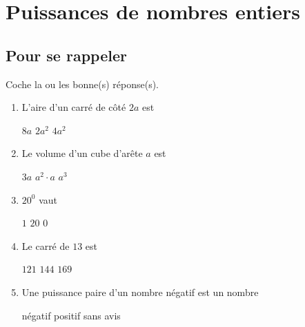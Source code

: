 \documentclass[../../syllabus_2.tex]{subfiles}
\begin{document}
\chapter{Puissances de nombres entiers}
\section{Pour se rappeler}
\begin{exercise}
	Coche la ou les bonne(s) réponse(s).\par
	\begin{enumerate}[itemsep=1em]
		\item L'aire d'un carré de côté \(2a\) est
		      \begin{qcm}
			      \choice \(8a\)
			      \choice \(2a^2\)
			      \choice \(4a^2\)
		      \end{qcm}

		\item Le volume d'un cube d'arête \(a\) est
		      \begin{qcm}
			      \choice \(3a\)
			      \choice \(a^2 \cdot a\)
			      \choice \(a^3\)
		      \end{qcm}

		\item \(20^0\) vaut
		      \begin{qcm}
			      \choice \(1\)
			      \choice \(20\)
			      \choice \(0\)
		      \end{qcm}

		\item Le carré de \(13\) est
		      \begin{qcm}
			      \choice \(121\)
			      \choice \(144\)
			      \choice \(169\)
		      \end{qcm}

		\item Une puissance paire d'un nombre négatif est un nombre
		      \begin{qcm}
			      \choice négatif
			      \choice positif
			      \choice sans avis
		      \end{qcm}
	\end{enumerate}
\end{exercise}
\vspace{1.5em}
\end{document}
